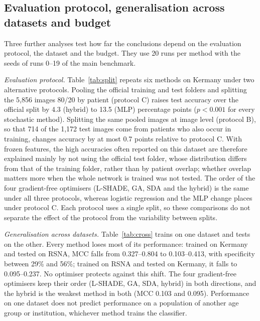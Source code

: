 \documentclass[10pt,letterpaper]{article}
\begin{document}


\subsection{Evaluation protocol, generalisation across datasets and budget}\label{sec:robust}
Three further analyses test how far the conclusions depend on the evaluation protocol, the dataset and the budget. They use 20 runs per method with the seeds of runs 0--19 of the main benchmark.

\emph{Evaluation protocol.} Table~\ref{tab:split} repeats six methods on Kermany under two alternative protocols. Pooling the official training and test folders and splitting the 5,856 images 80/20 by patient (protocol C) raises test accuracy over the official split by 4.3 (hybrid) to 13.5 (MLP) percentage points ($p<0.001$ for every stochastic method). Splitting the same pooled images at image level (protocol B), so that 714 of the 1,172 test images come from patients who also occur in training, changes accuracy by at most 0.7 points relative to protocol C. With frozen features, the high accuracies often reported on this dataset are therefore explained mainly by not using the official test folder, whose distribution differs from that of the training folder, rather than by patient overlap; whether overlap matters more when the whole network is trained was not tested. The order of the four gradient-free optimisers (L-SHADE, GA, SDA and the hybrid) is the same under all three protocols, whereas logistic regression and the MLP change places under protocol C. Each protocol uses a single split, so these comparisons do not separate the effect of the protocol from the variability between splits.

\emph{Generalisation across datasets.} Table~\ref{tab:cross} trains on one dataset and tests on the other. Every method loses most of its performance: trained on Kermany and tested on RSNA, MCC falls from 0.327--0.804 to 0.103--0.413, with specificity between 29\% and 56\%; trained on RSNA and tested on Kermany, it falls to 0.095--0.237. No optimiser protects against this shift. The four gradient-free optimisers keep their order (L-SHADE, GA, SDA, hybrid) in both directions, and the hybrid is the weakest method in both (MCC 0.103 and 0.095). Performance on one dataset does not predict performance on a population of another age group or institution, whichever method trains the classifier.
\end{document}
